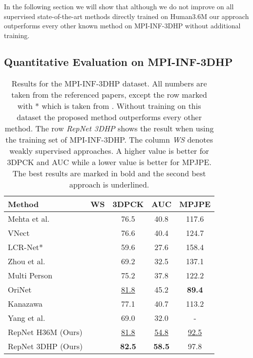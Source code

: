 \documentclass[10pt,twocolumn,letterpaper]{article}
\begin{document}
In the following section we will show that although we do not improve on all supervised state-of-the-art methods directly trained on Human3.6M our approach outperforms every other known method on MPI-INF-3DHP without additional training.

\subsection{Quantitative Evaluation on MPI-INF-3DHP}
\label{sec:3dhp}
\begin{table}[htp]
	\footnotesize
	\caption{Results for the MPI-INF-3DHP dataset. All numbers are taken from the referenced papers, except the row marked with * which is taken from \cite{singleshotmultiperson2018}. Without training on this dataset the proposed method outperforms every other method. The row \textit{RepNet 3DHP} shows the result when using the training set of MPI-INF-3DHP. The column \textit{WS} denotes weakly supervised approaches. A higher value is better for 3DPCK and AUC while a lower value is better for MPJPE. The best results are marked in bold and the second best approach is underlined.}
	\centering
	\begin{tabular}{l|c|ccc}
 		Method & WS & 3DPCK & AUC & MPJPE \\
		\hline
		\rowcolor{grayLight}
		Mehta et al. \cite{mpii3dhp2017} & & 76.5 & 40.8 & 117.6 \\
		\rowcolor{grayDark}
		VNect \cite{VNect_SIGGRAPH2017} &  & 76.6 & 40.4 & 124.7 \\
		\rowcolor{grayLight}
		LCR-Net\cite{lcrnet2017}* & & 59.6 & 27.6 & 158.4 \\		
		\rowcolor{grayDark}
		Zhou et al. \cite{Zhou_2017_ICCV} & & 69.2 & 32.5 & 137.1 \\
		\rowcolor{grayLight}
		Multi Person \cite{singleshotmultiperson2018} & & 75.2 & 37.8 & 122.2 \\
		\rowcolor{grayDark}
		OriNet \cite{OriNet2018} & & \underline{81.8} & 45.2 & \textbf{89.4} \\
		\rowcolor{grayLight}
		Kanazawa \cite{Kanazawa2018} & \checkmark & 77.1 &	40.7 & 113.2 \\
		\rowcolor{grayDark}
		Yang et al. \cite{Yang2018} & \checkmark & 69.0 & 32.0 & - \\
		\hline
		RepNet H36M (Ours)  & \checkmark & \underline{81.8}  & \underline{54.8} & \underline{92.5}\\
		RepNet 3DHP (Ours)  & \checkmark &   \textbf{82.5}   & \textbf{58.5}  & 97.8 \\
	\end{tabular}
	\label{tab:mpiinf3dhp}
\end{table} 
\end{document}

